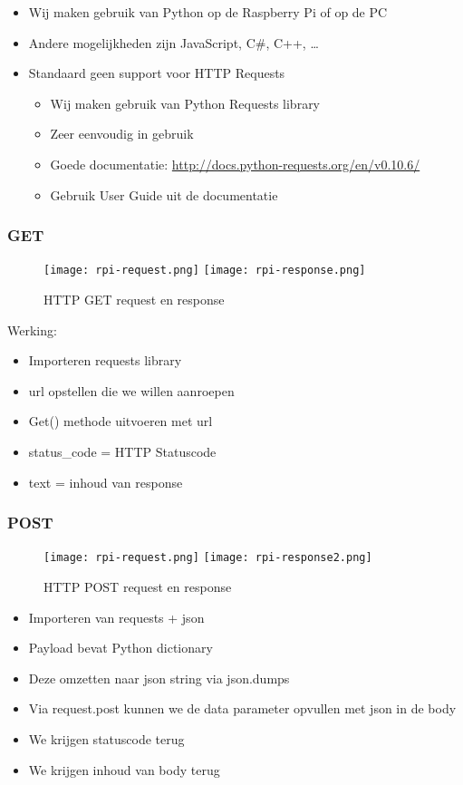 \documentclass{article}
\begin{document}
\begin{itemize}
    \item Wij maken gebruik van Python op de Raspberry Pi of op de PC
    \item Andere mogelijkheden zijn JavaScript, C\#, C++, \dots
    \item Standaard geen support voor HTTP Requests
    \begin{itemize}
        \item Wij maken gebruik van Python Requests library
        \item Zeer eenvoudig in gebruik
        \item Goede documentatie: \url{http://docs.python-requests.org/en/v0.10.6/}
        \item Gebruik User Guide uit de documentatie
    \end{itemize}
\end{itemize}

\subsubsection{GET}

\begin{figure}[H]
    \centering
    \texttt{[image: rpi-request.png]}
    \texttt{[image: rpi-response.png]}
    \caption{HTTP GET request en response}
\end{figure}

Werking: 
\begin{itemize}
    \item Importeren requests library
    \item url opstellen die we willen aanroepen
    \item Get() methode uitvoeren met url
    \item status\_code = HTTP Statuscode
    \item text = inhoud van response
\end{itemize}

\subsubsection{POST}

\begin{figure}[H]
    \centering
    \texttt{[image: rpi-request.png]}
    \texttt{[image: rpi-response2.png]}
    \caption{HTTP POST request en response}
\end{figure}

\begin{itemize}
    \item Importeren van requests + json
    \item Payload bevat Python dictionary
    \item Deze omzetten naar json string via json.dumps
    \item Via request.post kunnen we de data parameter opvullen met json in de body
    \item We krijgen statuscode terug
    \item We krijgen inhoud van body terug
\end{itemize}
\end{document}
